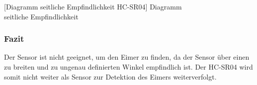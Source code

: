 \begin{minipage}{\textwidth}
\begin{minipage}{0.5\textwidth}
        [Diagramm seitliche Empfindlichkeit HC-SR04]
        {Diagramm \\ seitliche Empfindlichkeit}
\end{minipage}
\end{minipage}

\subsubsection{Fazit}
Der Sensor ist nicht geeignet, um den Eimer zu finden, da der Sensor über 
einen zu breiten und zu ungenau definierten Winkel empfindlich ist. Der 
HC-SR04 wird somit nicht weiter als Sensor zur Detektion des Eimers 
weiterverfolgt. 

